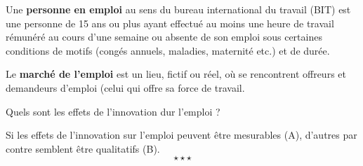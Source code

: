 Une \textbf{personne en emploi} au sens du bureau international du travail (BIT) est une personne de 15 ans ou plus ayant effectué au moins une heure de travail rémunéré au cours d'une semaine ou absente de son emploi sous certaines conditions de motifs (congés annuels, maladies, maternité etc.) et de durée.

{Le \textbf{marché de l'emploi} est un lieu, fictif ou réel, où se rencontrent offreurs et demandeurs d'emploi (celui qui offre sa force de travail.}

Quels sont les effets de l'innovation dur l'emploi ?\newline

Si les effets de l'innovation sur l'emploi peuvent être mesurables (A), d'autres par contre semblent être qualitatifs (B). $$\star \star \star$$

